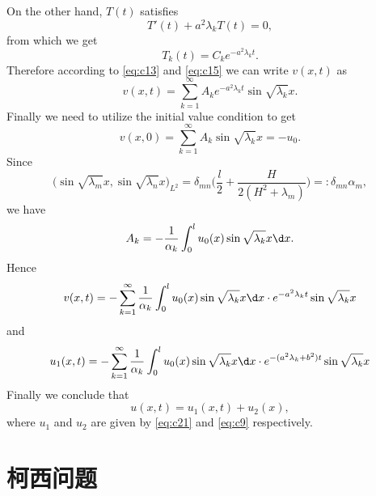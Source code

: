 \begin{solution}
    On the other hand, $T(t)$ satisfies
    \begin{equation}\label{eq:c14}
      T'(t) + a^2\lambda_k T(t) = 0,
    \end{equation}
    from which we get
    \begin{equation}\label{eq:c15}
      T_k(t) = C_k e^{-a^2\lambda_k t}.
    \end{equation}
    Therefore according to \eqref{eq:c13} and \eqref{eq:c15} we can write $v(x,t)$ as
    \begin{equation}\label{eq:c16}
      v(x,t) = \sum_{k=1}^\infty A_k e^{-a^2\lambda_k t} \sin\sqrt{\lambda_k} x.
    \end{equation}
    Finally we need to utilize the initial value condition to get
    \begin{equation}\label{eq:c17}
      v(x,0) = \sum_{k=1}^\infty A_k \sin\sqrt{\lambda_k} x = -u_0.
    \end{equation}
    Since
    \begin{equation}\label{eq:c18}
      \bigl(\sin\sqrt{\lambda_m}x, \sin\sqrt{\lambda_n}x\bigr)_{L^2}
       = \delta_{mn} \biggl(\frac{l}{2} + \frac{H}{2(H^2+\lambda_m)}\biggr)
       =: \delta_{mn} \alpha_m,
    \end{equation}
    we have
    \begin{equation}\label{eq:c19}
      A_k = -\frac{1}{\alpha_k} \int_0^l u_0(x) \sin\sqrt{\lambda_k} x \d x.
    \end{equation}
    Hence
    \begin{equation}\label{eq:c20}
      v(x,t) = -\sum_{k=1}^\infty \frac{1}{\alpha_k}
        \int_0^l u_0(x) \sin\sqrt{\lambda_k}x \d x \cdot
        e^{-a^2\lambda_k t} \sin\sqrt{\lambda_k} x
    \end{equation}
    and
    \begin{equation}\label{eq:c21}
      u_1(x,t) = -\sum_{k=1}^\infty \frac{1}{\alpha_k}
        \int_0^l u_0(x) \sin\sqrt{\lambda_k}x \d x \cdot
        e^{-(a^2\lambda_k + b^2)t} \sin\sqrt{\lambda_k} x
    \end{equation}
    Finally we conclude that
    \begin{equation}\label{eq:c22}
      u(x,t) = u_1(x,t) + u_2(x),
    \end{equation}
    where $u_1$ and $u_2$ are given by \eqref{eq:c21} and \eqref{eq:c9}
    respectively.
\end{solution}


\section{柯西问题}

